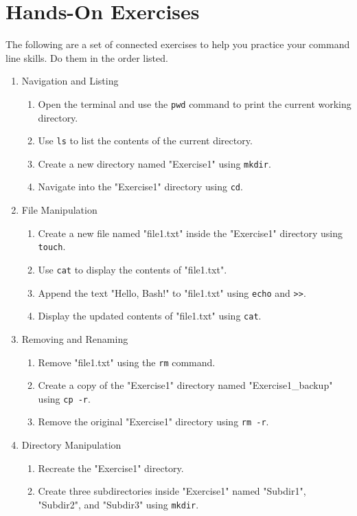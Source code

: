 \section{Hands-On Exercises}

The following are a set of connected exercises to help you practice your command line skills. Do them in the order listed.

\begin{enumerate}
\item Navigation and Listing
\begin{enumerate}[nosep]
	\item Open the terminal and use the \texttt{pwd} command to print the current working directory.
	\item Use \texttt{ls} to list the contents of the current directory.
	\item Create a new directory named "Exercise1" using \texttt{mkdir}.
	\item Navigate into the "Exercise1" directory using \texttt{cd}.
\end{enumerate}
\item File Manipulation
\begin{enumerate}
	\item Create a new file named "file1.txt" inside the "Exercise1" directory using \texttt{touch}.
	\item Use \texttt{cat} to display the contents of "file1.txt".
	\item Append the text "Hello, Bash!" to "file1.txt" using \texttt{echo} and \texttt{>>}.
	\item Display the updated contents of "file1.txt" using \texttt{cat}.
\end{enumerate}
\item Removing and Renaming
\begin{enumerate}
	\item Remove "file1.txt" using the \texttt{rm} command.
	\item Create a copy of the "Exercise1" directory named "Exercise1\_backup" using \texttt{cp -r}.
	\item Remove the original "Exercise1" directory using \texttt{rm -r}.
\end{enumerate}
\item Directory Manipulation
\begin{enumerate}
	\item Recreate the "Exercise1" directory.
	\item Create three subdirectories inside "Exercise1" named "Subdir1", "Subdir2", and "Subdir3" using \texttt{mkdir}.

\end{enumerate}
\end{enumerate}
